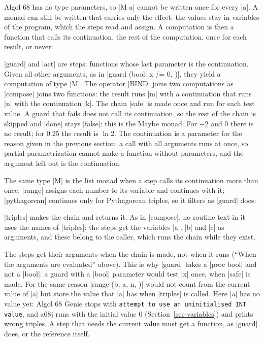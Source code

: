 Algol 68 has no type parameters, so \code|M a| cannot be written once for
every \code|a|. A monad can still be written that carries only the
effect: the values stay in variables of the program, which the steps read
and assign. A computation is then a function that calls its continuation,
the rest of the computation, once for each result, or never:


\noindent \code|guard| and \code|act| are steps: functions whose last
parameter is the continuation. Given all other arguments, as in
\code|guard (bool: x /= 0, )|, they yield a computation of type
\code|M|. The operator \code|BIND| joins two computations as
\code|compose| joins two functions: the result runs \code|m| with a
continuation that runs \code|n| with the continuation \code|k|. The chain
\code|safe| is made once and run for each test value. A guard that fails
does not call its continuation, so the rest of the chain is skipped and
\code|done| stays \code|false|: this is the Maybe monad. For $-2$ and 0
there is no result; for 0.25 the result is $\ln 2$. The continuation is a
parameter for the reason given in the previous section: a call with all
arguments runs at once, so partial parametrization cannot make a function
without parameters, and the argument left out is the continuation.

The same type \code|M| is the list monad when a step calls its
continuation more than once. \code|range| assigns each number to its
variable and continues with it; \code|pythagorean| continues only for
Pythagorean triples, so it filters as \code|guard| does:


\noindent \code|triples| makes the chain and returns it. As in
\code|compose|, no routine text in it uses the names of \code|triples|:
the steps get the variables \code|a|, \code|b| and \code|c| as arguments,
and these belong to the caller, which runs the chain while they exist.

\begin{pitfall}
The steps get their arguments when the chain is made, not when it runs
(``When the arguments are evaluated'' above). This is why \code|guard|
takes a \code|proc bool| and not a \code|bool|: a guard with a
\code|bool| parameter would test \code|x| once, when \code|safe| is
made. For the same reason
\code|range (b, a, n, )| would not count from the current value of
\code|a| but store the value that \code|a| has when \code|triples| is
called. Here \code|a| has no value yet: Algol 68 Genie stops with
\texttt{attempt to use an uninitialised INT value}, and a68j runs with the
initial value 0 (Section~\ref{sec-variables}) and prints wrong triples. A
step that needs the current value must get a function, as \code|guard|
does, or the reference itself.
\end{pitfall}


